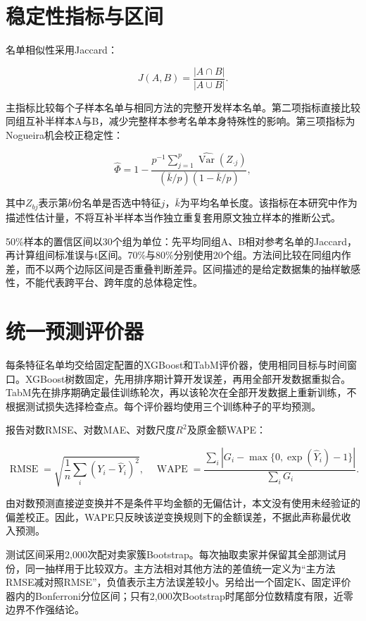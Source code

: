 \documentclass{sufethesismas}
\begin{document}
\section{稳定性指标与区间}

名单相似性采用Jaccard：

\[
J(A,B)=\frac{|A\cap B|}{|A\cup B|}.
\]

主指标比较每个子样本名单与相同方法的完整开发样本名单。第二项指标直接比较同组互补半样本A与B，减少完整样本参考名单本身特殊性的影响。第三项指标为Nogueira机会校正稳定性：

\[
\widehat\Phi=
1-\frac{p^{-1}\sum_{j=1}^{p}\widehat{\operatorname{Var}}(Z_{\cdot j})}
{(\bar k/p)(1-\bar k/p)},
\]

其中\(Z_{bj}\)表示第\(b\)份名单是否选中特征\(j\)，\(\bar k\)为平均名单长度。该指标在本研究中作为描述性估计量，不将互补半样本当作独立重复套用原文独立样本的推断公式。

50\%样本的置信区间以30个组为单位：先平均同组A、B相对参考名单的Jaccard，再计算组间标准误与t区间。70\%与80\%分别使用20个组。方法间比较在同组内作差，而不以两个边际区间是否重叠判断差异。区间描述的是给定数据集的抽样敏感性，不能代表跨平台、跨年度的总体稳定性。

\section{统一预测评价器}

每条特征名单均交给固定配置的XGBoost和TabM评价器，使用相同目标与时间窗口。XGBoost树数固定，先用排序期计算开发误差，再用全部开发数据重拟合。TabM先在排序期确定最佳训练轮次，再以该轮次在全部开发数据上重新训练，不根据测试损失选择检查点。每个评价器均使用三个训练种子的平均预测。

报告对数RMSE、对数MAE、对数尺度\(R^2\)及原金额WAPE：

\[
\operatorname{RMSE}=\sqrt{\frac1n\sum_i(Y_i-\widehat Y_i)^2},
\quad
\operatorname{WAPE}=
\frac{\sum_i|G_i-\max\{0,\exp(\widehat Y_i)-1\}|}
{\sum_iG_i}.
\]

由对数预测直接逆变换并不是条件平均金额的无偏估计，本文没有使用未经验证的偏差校正。因此，WAPE只反映该逆变换规则下的金额误差，不据此声称最优收入预测。

测试区间采用2,000次配对卖家簇Bootstrap。每次抽取卖家并保留其全部测试月份，同一抽样用于比较双方。主方法相对其他方法的差值统一定义为``主方法RMSE减对照RMSE''，负值表示主方法误差较小。另给出一个固定K、固定评价器内的Bonferroni分位区间；只有2,000次Bootstrap时尾部分位数精度有限，近零边界不作强结论。
\end{document}

